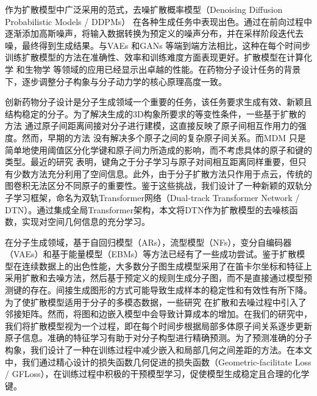 作为扩散模型中广泛采用的范式，去噪扩散概率模型（Denoising Diffusion Probabilistic Models / DDPMs） \cite{ddpm_ho_20,dpm_jascha_15}在各种生成任务中表现出色。通过在前向过程中逐渐添加高斯噪声，将输入数据转换为预定义的噪声分布，并在采样阶段迭代去噪，最终得到生成结果。与VAEs \cite{vae_kingma_13}和GANs \cite{gan_goodfellow_14}等端到端方法相比，这种在每个时间步训练扩散模型的方法在准确性、效率和训练难度方面表现更好。扩散模型在计算化学 \cite{edm_hoogeboom_22,targetdiff_guan_23}和生物学 \cite{diffab_luo_22,protseed_shi_23}等领域的应用已经显示出卓越的性能。在药物分子设计任务的背景下，逐步调整分子构象与分子动力学的核心原理高度一致。

创新药物分子设计是分子生成领域一个重要的任务，该任务要求生成有效、新颖且结构稳定的分子。为了解决生成的3D构象所要求的等变性条件，一些基于扩散的方法 \cite{edm_hoogeboom_22,mdm_huang_23}通过原子间距离间接对分子进行建模，这直接反映了原子间相互作用力的强度。然而，早期的方法 \cite{edm_hoogeboom_22}没有解决多个原子之间的复杂原子间关系。而MDM \cite{mdm_huang_23}只是简单地使用阈值区分化学键和原子间力所造成的影响，而不考虑具体的原子和键的类型。最近的研究 \cite{moleformer_yuan_23}表明，键角之于分子学习与原子对间相互距离同样重要，但只有少数方法充分利用了空间信息。此外，由于分子扩散方法只作用于点云，传统的图卷积无法区分不同原子的重要性。鉴于这些挑战，我们设计了一种新颖的双轨分子学习框架，命名为双轨Transformer网络（Dual-track Transformer Network / DTN）。通过集成全局Transformer架构，本文将DTN作为扩散模型的去噪核函数，实现对空间几何信息的充分学习。

在分子生成领域，基于自回归模型（ARs）\cite{gschnet_wallach_19,gshperenet_luo_22}，流型模型（NFs）\cite{moflow_zang_20,graphaf_shi_20}，变分自编码器（VAEs）\cite{jtvae_jin_18,cgvae_liu_18}和基于能量模型（EBMs）\cite{graphebm_liu_21}等方法已经有了一些成功尝试。鉴于扩散模型在连续数据上的出色性能，大多数分子图生成模型采用了在笛卡尔坐标和特征上采用扩散和去噪方法，然后基于预定义的规则生成分子图，而不是直接通过模型预测键的存在。间接生成图形的方式可能导致生成样本的稳定性和有效性有所下降。为了使扩散模型适用于分子的多模态数据，一些研究 \cite{edpgnn_niu_20,digress_vignac_22,midi_vignac_23}在扩散和去噪过程中引入了邻接矩阵。然而，将图和边嵌入模型中会导致计算成本的增加。在我们的研究中，我们将扩散模型视为一个过程，即在每个时间步根据局部多体原子间关系逐步更新原子信息。准确的特征学习有助于对分子构型进行精确预测。为了预测准确的分子构象，我们设计了一种在训练过程中减少嵌入和局部几何之间差距的方法。在本文中，我们通过精心设计的损失函数几何促进的损失函数（Geometric-facilitate Loss / GFLoss），在训练过程中积极的干预模型学习，促使模型生成稳定且合理的化学键。

